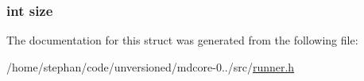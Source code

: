 \hypertarget{structrunner__fifo_a439227feff9d7f55384e8780cfc2eb82}{
\subsubsection[{size}]{\setlength{\rightskip}{0pt plus 5cm}int size}}\label{structrunner__fifo_a439227feff9d7f55384e8780cfc2eb82}


The documentation for this struct was generated from the following file\-:\begin{DoxyCompactItemize}
\item 
/home/stephan/code/unversioned/mdcore-\/0../src/\hyperlink{runner_8h}{runner.\-h}\end{DoxyCompactItemize}
